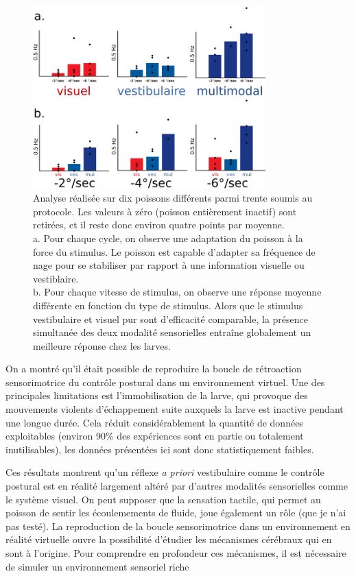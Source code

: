 \begin{figure}
\centering
\includegraphics[width=0.8\textwidth]{./files/stats.svg.png}
\caption{
Analyse réalisée sur dix poissons différents parmi trente soumis au protocole. Les valeurs à zéro (poisson entièrement inactif) sont retirées, et il reste donc environ quatre points par moyenne.
\\
a. Pour chaque cycle, on observe une adaptation du poisson à la force du stimulus. Le poisson est capable d'adapter sa fréquence de nage pour se stabiliser par rapport à une information visuelle ou vestiblaire.
\\
b. Pour chaque vitesse de stimulus, on observe une réponse moyenne différente en fonction du type de stimulus. Alors que le stimulus vestibulaire et visuel pur sont d'efficacité comparable, la présence simultanée des deux modalité sensorielles entraîne globalement un meilleure réponse chez les larves.
}
\end{figure}


On a montré qu'il était possible de reproduire la boucle de rétroaction sensorimotrice du contrôle postural dans un environnement virtuel. Une des principales limitations est l'immobilisation de la larve, qui provoque des mouvements violents d'échappement suite auxquels la larve est inactive pendant une longue durée. Cela réduit considérablement la quantité de données exploitables (environ 90\% des expériences sont en partie ou totalement inutilisables), les données présentées ici sont donc statistiquement faibles.

Ces résultats montrent qu'un réflexe \emph{a priori} vestibulaire comme le contrôle postural est en réalité largement altéré par d'autres modalités sensorielles comme le système visuel. On peut supposer que la sensation tactile, qui permet au poisson de sentir les écoulemements de fluide, joue également un rôle (que je n'ai pas testé). La reproduction de la boucle sensorimotrice dans un environnement en réalité virtuelle ouvre la possibilité d'étudier les mécanismes cérébraux qui en sont à l'origine. Pour comprendre en profondeur ces mécanismes, il est nécessaire de simuler un environnement sensoriel riche  

